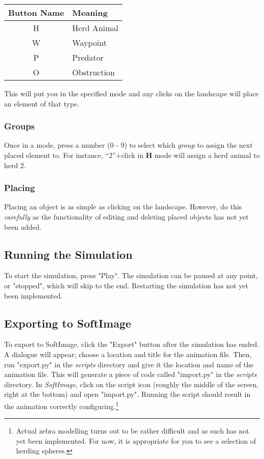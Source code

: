 \begin{tabular}{cl}
Button Name & Meaning\\
\hline
H & Herd Animal\\

W & Waypoint\\

P & Predator\\

O & Obstruction\\

\end{tabular}

\vspace{6 mm}

\noindent This will put you in the specified mode and any clicks on the landscape will place an element of that type.

\subsubsection{Groups}
Once in a mode, press a number (0 - 9) to select which \emph{group} to assign the next placed element to. For instance, ``2''+click in \textbf{H} mode will assign a herd animal to herd 2.

\subsubsection{Placing}
Placing an object is as simple as clicking on the landscape. However, do this \emph{carefully} as the functionality of editing and deleting placed objects has not yet been added.

\subsection{Running the Simulation}
To start the simulation, press "Play". The simulation can be paused at any point, or "stopped", which will skip to the end. Restarting the simulation has not yet been implemented.

\subsection{Exporting to SoftImage}
To export to SoftImage, click the "Export" button after the simulation has ended. A dialogue will appear; choose a location and title for the animation file. Then, run "export.py" in the \emph{scripts} directory and give it the location and name of the animation file. This will generate a piece of code called "import.py" in the \emph{scripts} directory. In \emph{SoftImage}, click on the script icon (roughly the middle of the screen, right at the bottom) and open "import.py". Running the script should result in the animation correctly configuring.\footnote{ Actual zebra modelling turns out to be rather difficult and as such has not yet been implemented. For now, it is appropriate for you to see a selection of herding spheres.}